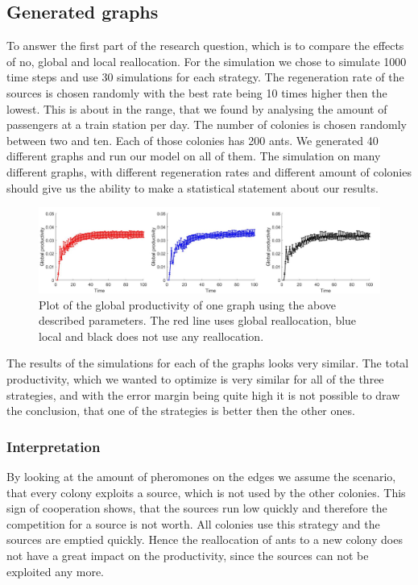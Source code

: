 \subsection{Generated graphs} \label{results1}
To answer the first part of the research question, which is to compare the effects of no, global and local reallocation. For the simulation we chose to simulate 1000 time steps and use 30 simulations for each strategy. The regeneration rate of the sources is chosen randomly with the best rate being 10 times higher then the lowest. This is about in the range, that we found by analysing the amount of passengers at a train station per day. The number of colonies is chosen randomly between two and ten. Each of those colonies has 200 ants. We generated 40 different graphs and run our model on all of them. The simulation on many different graphs, with different regeneration rates and different amount of colonies should give us the ability to make a statistical statement about our results.

\begin{figure}[H]
	\centering
	\includegraphics[scale=0.5]{globalProductivity.pdf}
	\caption{Plot of the global productivity of one graph using the above described parameters. The red line uses global reallocation, blue local and black does not use any reallocation.}
\end{figure}
The results of the simulations for each of the graphs looks very similar. The total productivity, which we wanted to optimize is very similar for all of the three strategies, and with the error margin being quite high it is not possible to draw the conclusion, that one of the strategies is better then the other ones. 
\subsubsection{Interpretation}
By looking at the amount of pheromones on the edges we assume the scenario, that every colony exploits a source, which is not used by the other colonies. This sign of cooperation shows, that the sources run low quickly and therefore the competition for a source is not worth. All colonies use this strategy and the sources are emptied quickly. Hence the reallocation of ants to a new colony does not have a great impact on the productivity, since the sources can not be exploited any more. 

